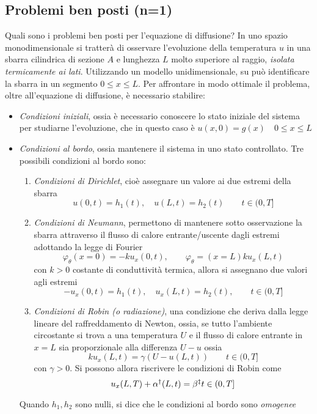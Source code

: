 \documentclass[a4paper,12pt, draft]{article}
\theoremstyle{break}
\let\phi\varphi
\numberwithin{equation}{section}
\begin{document}
\subsection{Problemi ben posti (n=1)}
Quali sono i problemi ben posti per l'equazione di diffusione?  
In uno spazio monodimensionale si tratterà di osservare l'evoluzione della temperatura $u$ in una sbarra cilindrica di sezione $A$ e lunghezza $L$ molto superiore al raggio, \emph{isolata termicamente ai lati}.
Utilizzando un modello unidimensionale, su può identificare la sbarra in un segmento $0\leq x \leq L$. Per affrontare in modo ottimale il problema, oltre all'equazione di diffusione, è necessario stabilire:
\begin{itemize}
\item \emph{Condizioni iniziali}, ossia è necessario conoscere lo stato iniziale del sistema per studiarne l'evoluzione, che in questo caso è $u(x, 0) = g(x) \quad 0 \leq x \leq L$

\item \emph{Condizioni al bordo}, ossia mantenere il sistema in uno stato controllato. Tre possibili condizioni al bordo sono:
\begin{enumerate}
\item \emph{Condizioni di Dirichlet}, cioè assegnare un valore ai due estremi della sbarra $$u(0, t) = h_1(t), \quad u(L,t) = h_2(t) \qquad t \in (0, T]$$
\item \emph{Condizioni di Neumann}, permettono di mantenere sotto osservazione la sbarra attraverso il flusso di calore entrante/uscente dagli estremi adottando la legge di Fourier
$$
\phi_{\theta}(x = 0) = -ku_x(0,t), \qquad \phi_{\theta}
= (x = L) ku_x(L,t)
$$
con $k > 0$ costante di conduttività termica, allora si assegnano due valori agli estremi
$$
-u_x(0,t) = h_1(t), \quad u_x(L,t) = h_2(t), \qquad t \in (0,T]
$$
\item \emph{Condizioni di Robin (o radiazione)}, una condizione che deriva dalla legge lineare del raffreddamento di Newton, ossia, se tutto l'ambiente circostante si trova a una temperatura $U$ e il flusso di calore entrante in $x = L$ sia proporzionale alla differenza $U-u$ ossia
$$
ku_x(L, t) = \gamma (U-u(L,t)) \qquad t \in (0,T]
$$
con $\gamma >0$. Si possono allora riscrivere le condizioni di Robin come
$$
u_x(L,T) +\alpha \symbolfootnotemark[2] u(L,t) = \beta \symbolfootnotemark[3] \qquad t \in (0,T]
$$
\end{enumerate}
Quando $h_1, h_2$ sono nulli, si dice che le condizioni al bordo sono \emph{omogenee}
\end{itemize}
\end{document}
